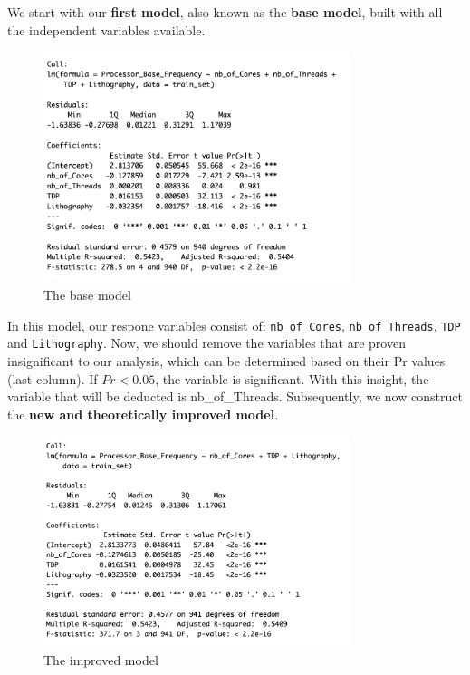 We start with our \textbf{first model}, also known as the \textbf{base model}, built with all the independent variables available. \\

\begin{figure}[H]
    \centering
    \includegraphics[width=0.8\textwidth]{graphics/base_model.png}
    \caption{The base model}
\end{figure}


In this model, our respone variables consist of: \texttt{nb\_of\_Cores}, \texttt{nb\_of\_Threads}, \texttt{TDP} and \texttt{Lithography}. Now, we should remove the variables that are proven insignificant to our analysis, which can be determined based on their Pr values (last column). If $Pr < 0.05$, the variable is significant. With this insight, the variable that will be deducted is nb\_of\_Threads. Subsequently, we now construct the \textbf{new and theoretically improved model}. \\

\begin{figure}[H]
    \centering
    \includegraphics[width=0.8\textwidth]{graphics/improved_model.png}
    \caption{The improved model}
\end{figure}


